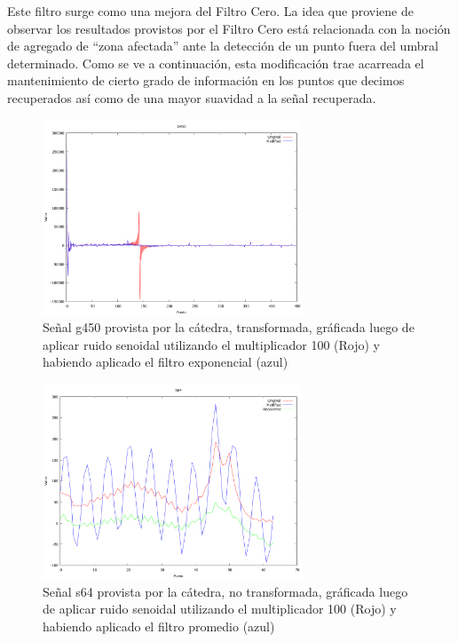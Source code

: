 Este filtro surge como una mejora del Filtro Cero. La idea que proviene de
observar los resultados provistos por el Filtro Cero est\'a relacionada con la
noci\'on de agregado de ``zona afectada'' ante la detecci\'on de un punto fuera
del umbral determinado. Como se ve a continuaci\'on, esta modificaci\'on trae
acarreada el mantenimiento de cierto grado de informaci\'on en los puntos que
decimos recuperados as\'i como de una mayor suavidad a la se\~nal recuperada.


\begin{figure}
\begin {center}
\includegraphics[width=220pt]{../matlab/g450-sin100-exp-spec.png}
\end {center}
\caption{Se\~nal g450 provista por la c\'atedra, transformada, gr\'aficada
luego de aplicar ruido senoidal utilizando el multiplicador 100 (Rojo) y 
habiendo aplicado el filtro exponencial (azul)}
\label{fig:SinProm}
\end{figure}

\begin{figure}
\begin {center}
\includegraphics[width=220pt]{../matlab/s64-sin100-exp.png}
\end {center}
\caption{Se\~nal s64 provista por la c\'atedra, no transformada, gr\'aficada
luego de aplicar ruido senoidal utilizando el multiplicador 100 (Rojo) y 
habiendo aplicado el filtro promedio (azul)}
\label{fig:SinProm}
\end{figure}


